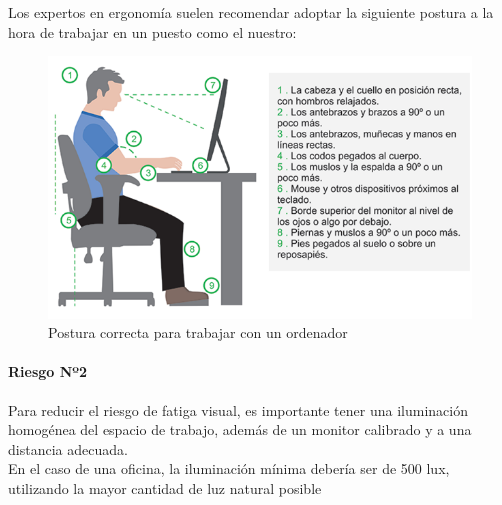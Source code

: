 Los expertos en ergonomía suelen recomendar adoptar la siguiente postura a la hora de trabajar en un puesto como el nuestro:

\begin{figure}[H]
    \centering
    \includegraphics[width=1.0\textwidth]{Fol/posturaCorrecta.png}
    \caption{Postura correcta para trabajar con un ordenador}
\end{figure}

\paragraph*{Riesgo Nº2}
Para reducir el riesgo de fatiga visual, es importante tener una iluminación
homogénea del espacio de trabajo, además de un monitor calibrado y a una distancia
adecuada.\\
En el caso de una oficina, la iluminación mínima debería ser de 500 lux, utilizando la mayor cantidad de luz natural posible
